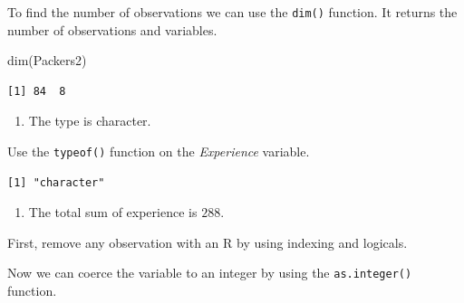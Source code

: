 \documentclass[
  letterpaper,
  DIV=11,
  numbers=noendperiod]{scrreprt}
\newenvironment{Shaded}{\begin{snugshade}}{\end{snugshade}}
\newcommand{\FunctionTok}[1]{\textcolor[rgb]{0.28,0.35,0.67}{#1}}
\newcommand{\NormalTok}[1]{\textcolor[rgb]{0.00,0.23,0.31}{#1}}
\newcommand{\OtherTok}[1]{\textcolor[rgb]{0.00,0.23,0.31}{#1}}
\newcommand{\SpecialCharTok}[1]{\textcolor[rgb]{0.37,0.37,0.37}{#1}}
\newcommand{\StringTok}[1]{\textcolor[rgb]{0.13,0.47,0.30}{#1}}
\providecommand{\tightlist}{%
  \setlength{\itemsep}{0pt}\setlength{\parskip}{0pt}}\usepackage{longtable,booktabs,array}
\begin{document}
To find the number of observations we can use the \texttt{dim()}
function. It returns the number of observations and variables.

\begin{Shaded}
\begin{Highlighting}[numbers=left,,]
\FunctionTok{dim}\NormalTok{(Packers2)}
\end{Highlighting}
\end{Shaded}

\begin{verbatim}
[1] 84  8
\end{verbatim}

\begin{enumerate}
\def\labelenumi{\arabic{enumi}.}
\setcounter{enumi}{1}
\tightlist
\item
  The type is character.
\end{enumerate}

Use the \texttt{typeof()} function on the \emph{Experience} variable.

\begin{Shaded}
\end{Shaded}

\begin{verbatim}
[1] "character"
\end{verbatim}

\begin{enumerate}
\def\labelenumi{\arabic{enumi}.}
\setcounter{enumi}{2}
\tightlist
\item
  The total sum of experience is \(288\).
\end{enumerate}

First, remove any observation with an R by using indexing and logicals.

\begin{Shaded}
\end{Shaded}

Now we can coerce the variable to an integer by using the
\texttt{as.integer()} function.

\begin{Shaded}
\end{Shaded}
\end{document}
